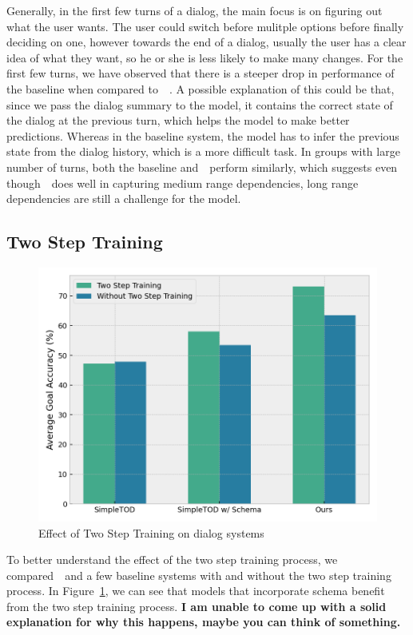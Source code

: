 Generally, in the first few turns of a dialog, the main focus is on figuring out what the user wants. The user could switch before mulitple options before finally deciding on one, however
towards the end of a dialog, usually the user has a clear idea of what they want, so he or she is less likely to make many changes.
For the first few turns, we have observed that there is a steeper drop in performance of the baseline when compared to~\oursys~.
A possible explanation of this could be that, since we pass the dialog summary to the model, it contains the correct state of the dialog at the previous turn, which helps the model to make better predictions.
Whereas in the baseline system, the model has to infer the previous state from the dialog history, which is a more difficult task.
In groups with large number of turns, both the baseline and~\oursys~perform similarly, which suggests even though~\oursys~does well in capturing
medium range dependencies, long range dependencies are still a challenge for the model.


\subsection{Two Step Training}

\begin{figure}[t]
    \centering
    \includegraphics[width=\linewidth]{assets/two_step_training.png}
    \caption{
        Effect of Two Step Training on dialog systems
    }
    \label{fig:two_step_training}
\end{figure}

To better understand the effect of the two step training process, we compared~\oursys~and a few baseline systems with and without the two step training process.
In Figure~\ref{fig:two_step_training}, we can see that models that incorporate schema benefit from the two step training process.
\textbf{I am unable to come up with a solid explanation for why this happens, maybe you can think of something.}

